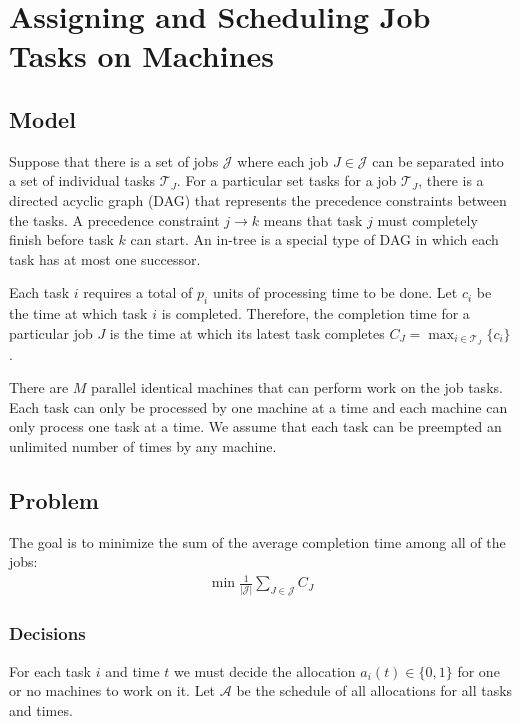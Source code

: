 \section{Assigning and Scheduling Job Tasks on Machines}

\subsection{Model}
Suppose that there is a set of jobs $\mathcal{J}$ where each job $J\in\mathcal{J}$ can be separated into a set of individual tasks $\mathcal{T}_J$.
For a particular set tasks for a job $\mathcal{T}_J$, there is a directed acyclic graph (DAG) that represents the precedence constraints between the tasks.
A precedence constraint $j\rightarrow k$ means that task $j$ must completely finish before task $k$ can start.
An in-tree is a special type of DAG in which each task has at most one successor.

Each task $i$ requires a total of $p_i$ units of processing time to be done.
Let $c_i$ be the time at which task $i$ is completed.
Therefore, the completion time for a particular job $J$ is the time at which its latest task completes $C_J=\max_{i\in\mathcal{T}_J}\{c_i\}$.

There are $M$ parallel identical machines that can perform work on the job tasks.
Each task can only be processed by one machine at a time and each machine can only process one task at a time.
We assume that each task can be preempted an unlimited number of times by any machine.

\subsection{Problem}

The goal is to minimize the sum of the average completion time among all of the jobs:
\begin{align}
	\min \frac{1}{|\mathcal{J}|}\sum_{J\in\mathcal{J}} C_J \label{eq:gen_prob}
\end{align}

\subsubsection{Decisions}

For each task $i$ and time $t$ we must decide the allocation $a_i(t)\in\{0,1\}$ for one or no machines to work on it.
Let $\mathcal{A}$ be the schedule of all allocations for all tasks and times.

